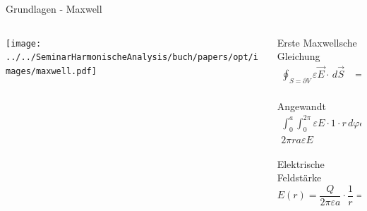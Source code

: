 \begin{frame}{Grundlagen - Maxwell}
    \begin{columns}
        \begin{column}{0.5\textwidth}
            \begin{center}
                \texttt{[image: ../../SeminarHarmonischeAnalysis/buch/papers/opt/images/maxwell.pdf]}
            \end{center}
        \end{column}

        \begin{column}{0.5\textwidth}
            \begin{block}{Erste Maxwellsche Gleichung}
                \begin{align*}
                    \oint_{S=\partial V} \varepsilon\vec{E} \cdot\, d\vec{S}
                    &=
                    \int_{V}\rho\, dV
                    \\
                \end{align*}
            \end{block}
            \pause
            \begin{block}{Angewandt}
                \begin{align*}
                    \int_{0}^{a}\int_{0}^{2\pi} \varepsilon E\cdot 1 \cdot r\, d\varphi dl
                    &=
                    Q
                    \\
                    2\pi ra\varepsilon E
                    &=
                    Q
                \end{align*}
            \end{block}
            \pause
            \begin{exampleblock}{Elektrische Feldstärke}
                \begin{equation*}
                    E(r)
                    =
                    \frac{Q}{2\pi\varepsilon a} \cdot \frac{1}{r}
                    =
                    C \cdot \frac{1}{r}
                \end{equation*}
            \end{exampleblock}
        \end{column}
    \end{columns}
\end{frame}

